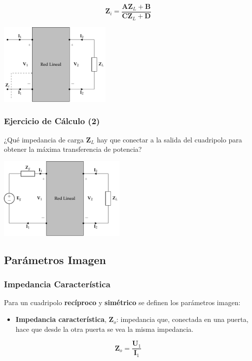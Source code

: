 \[
\mathbf{Z}_i = \frac{\mathbf{A} \mathbf{Z}_L + \mathbf{B}}{\mathbf{C}\mathbf{Z}_L + \mathbf{D}}
\]

\begin{center}
\includegraphics[height=4cm]{../figs/cuadripolo_cargado_impedancia_entrada.pdf}
\end{center}



\subsubsection{Ejercicio de Cálculo (2)}
\label{sec:org2e2860e}

¿Qué impedancia de carga \(\mathbf{Z}_L\) hay que conectar a la salida del cuadripolo para obtener la máxima transferencia de potencia?

\begin{center}
\includegraphics[height=4cm]{../figs/cuadripolo_cargado_fuente_tension.pdf}
\end{center}

\subsection{Parámetros Imagen}
\label{sec:org5e458cf}

\subsubsection{Impedancia Característica}
\label{sec:orgcd34bb0}
Para un cuadripolo \textbf{recíproco} y \textbf{simétrico} se definen los parámetros imagen:

\begin{itemize}
\item \textbf{Impedancia característica}, \(\mathbf{Z}_o\): impedancia que, conectada en una puerta, hace que desde la otra puerta se vea la misma impedancia.
\end{itemize}
\[
  \mathbf{Z}_o = \frac{\mathbf{U}_1}{\mathbf{I}_1}
\]

